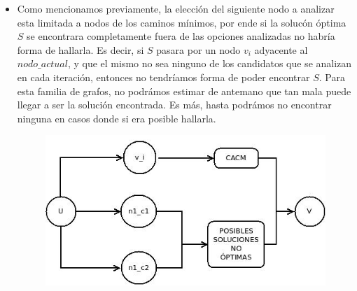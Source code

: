 \begin{itemize}
\item Como mencionamos previamente, la elecci\'on del siguiente nodo a analizar esta limitada a nodos de los caminos m\'inimos, por ende si la soluc\'on \'optima $S$ se encontrara completamente fuera de las opciones analizadas no habr\'ia forma de hallarla. Es decir, si $S$ pasara por un nodo $v_i$ adyacente al $nodo\_actual$, y que el mismo no sea ninguno de los candidatos que se analizan en cada iteraci\'on, entonces no tendr\'iamos forma de poder encontrar $S$. 
Para esta familia de grafos, no podr\'amos estimar de antemano que tan mala puede llegar a ser la soluci\'on encontrada. Es m\'as, hasta podr\'amos no encontrar ninguna en casos donde si era posible hallarla.
\begin{figure}[!hp]
	\centering
 	\includegraphics[scale=0.6]{img/familia_greedy.jpeg}
\end{figure}
\end{itemize}


\newpage
